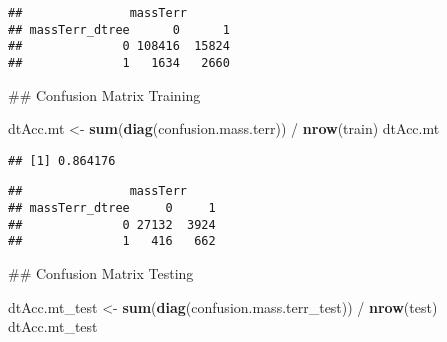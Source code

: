 \documentclass[11pt,letterpaper,]{article}
\newenvironment{Shaded}{\begin{snugshade}}{\end{snugshade}}
\newcommand{\KeywordTok}[1]{\textcolor[rgb]{0.13,0.29,0.53}{\textbf{{#1}}}}
\newcommand{\DataTypeTok}[1]{\textcolor[rgb]{0.13,0.29,0.53}{{#1}}}
\newcommand{\StringTok}[1]{\textcolor[rgb]{0.31,0.60,0.02}{{#1}}}
\newcommand{\NormalTok}[1]{{#1}}
\theoremstyle{definition}
\theoremstyle{definition}
\theoremstyle{definition}
\theoremstyle{remark}
\begin{document}
\begin{verbatim}
##               massTerr
## massTerr_dtree      0      1
##              0 108416  15824
##              1   1634   2660
\end{verbatim}

\begin{Shaded}
\begin{Highlighting}[]
\NormalTok{## Confusion Matrix Training}



\NormalTok{dtAcc.mt <-}\StringTok{ }\KeywordTok{sum}\NormalTok{(}\KeywordTok{diag}\NormalTok{(confusion.mass.terr))  /}\StringTok{ }\KeywordTok{nrow}\NormalTok{(train)}
\NormalTok{dtAcc.mt}
\end{Highlighting}
\end{Shaded}

\begin{verbatim}
## [1] 0.864176
\end{verbatim}

\begin{Shaded}
\end{Shaded}

\begin{verbatim}
##               massTerr
## massTerr_dtree     0     1
##              0 27132  3924
##              1   416   662
\end{verbatim}

\begin{Shaded}
\begin{Highlighting}[]
\NormalTok{## Confusion Matrix Testing}


\NormalTok{dtAcc.mt_test <-}\StringTok{ }\KeywordTok{sum}\NormalTok{(}\KeywordTok{diag}\NormalTok{(confusion.mass.terr_test))  /}\StringTok{ }\KeywordTok{nrow}\NormalTok{(test)}
\NormalTok{dtAcc.mt_test}
\end{Highlighting}
\end{Shaded}
\end{document}

